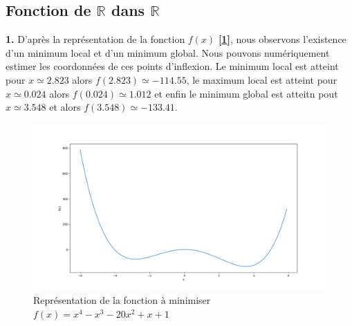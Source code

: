 \documentclass[12pt]{article}
\begin{document}
\subsection{Fonction de $\mathbb{R}$ dans $\mathbb{R}$}
\begin{minipage}{0.5\textwidth}

\textbf{\color{brick}1.} 
D'après la représentation de la fonction $f(x)$ \textbf{[\ref{Q1}]}, nous observons l'existence d'un minimum local et d'un minimum global. Nous pouvons numériquement estimer les coordonnées de ces points d'inflexion. Le minimum local est atteint pour $x\simeq 2.823$ alors $f(2.823)\simeq -114.55$, le maximum local est atteint pour $x\simeq0.024$ alors $f(0.024)\simeq 1.012$ et enfin le minimum global est atteitn pout $x\simeq 3.548$ et alors $f(3.548)\simeq -133.41$.
\end{minipage} \hfill
\begin{minipage}{0.45\textwidth}
\begin{figure}[H]
\includegraphics[width=1\textwidth]{Q1.png}
\caption{Représentation de la fonction à minimiser  $f(x)=x^4 - x^3 -20x^2+x+1$}
\label{Q1}
\end{figure}
\end{minipage}
\end{document}
